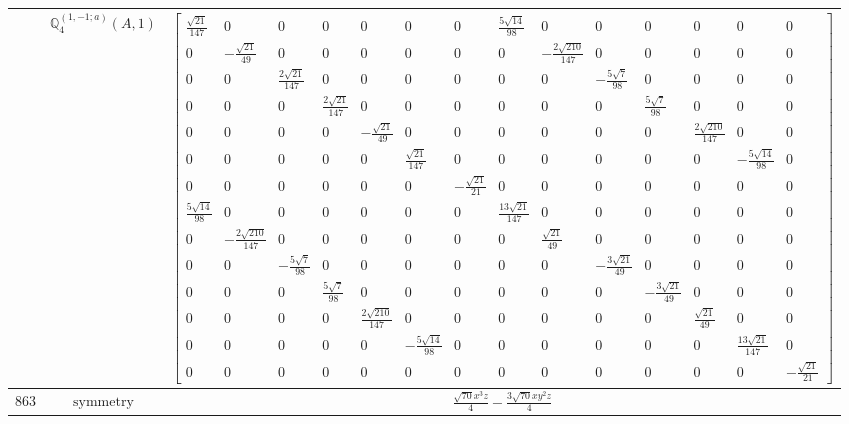 \documentclass[fleqn,8pt,landscape]{jsarticle}
\begin{document}
\begin{longtable}{ccc}
$  $ & $ \mathbb{Q}_{4}^{(1,-1;a)}(A,1) $ & $ \begin{bmatrix} \frac{\sqrt{21}}{147} & 0 & 0 & 0 & 0 & 0 & 0 & \frac{5 \sqrt{14}}{98} & 0 & 0 & 0 & 0 & 0 & 0 \\ 0 & - \frac{\sqrt{21}}{49} & 0 & 0 & 0 & 0 & 0 & 0 & - \frac{2 \sqrt{210}}{147} & 0 & 0 & 0 & 0 & 0 \\ 0 & 0 & \frac{2 \sqrt{21}}{147} & 0 & 0 & 0 & 0 & 0 & 0 & - \frac{5 \sqrt{7}}{98} & 0 & 0 & 0 & 0 \\ 0 & 0 & 0 & \frac{2 \sqrt{21}}{147} & 0 & 0 & 0 & 0 & 0 & 0 & \frac{5 \sqrt{7}}{98} & 0 & 0 & 0 \\ 0 & 0 & 0 & 0 & - \frac{\sqrt{21}}{49} & 0 & 0 & 0 & 0 & 0 & 0 & \frac{2 \sqrt{210}}{147} & 0 & 0 \\ 0 & 0 & 0 & 0 & 0 & \frac{\sqrt{21}}{147} & 0 & 0 & 0 & 0 & 0 & 0 & - \frac{5 \sqrt{14}}{98} & 0 \\ 0 & 0 & 0 & 0 & 0 & 0 & - \frac{\sqrt{21}}{21} & 0 & 0 & 0 & 0 & 0 & 0 & 0 \\ \frac{5 \sqrt{14}}{98} & 0 & 0 & 0 & 0 & 0 & 0 & \frac{13 \sqrt{21}}{147} & 0 & 0 & 0 & 0 & 0 & 0 \\ 0 & - \frac{2 \sqrt{210}}{147} & 0 & 0 & 0 & 0 & 0 & 0 & \frac{\sqrt{21}}{49} & 0 & 0 & 0 & 0 & 0 \\ 0 & 0 & - \frac{5 \sqrt{7}}{98} & 0 & 0 & 0 & 0 & 0 & 0 & - \frac{3 \sqrt{21}}{49} & 0 & 0 & 0 & 0 \\ 0 & 0 & 0 & \frac{5 \sqrt{7}}{98} & 0 & 0 & 0 & 0 & 0 & 0 & - \frac{3 \sqrt{21}}{49} & 0 & 0 & 0 \\ 0 & 0 & 0 & 0 & \frac{2 \sqrt{210}}{147} & 0 & 0 & 0 & 0 & 0 & 0 & \frac{\sqrt{21}}{49} & 0 & 0 \\ 0 & 0 & 0 & 0 & 0 & - \frac{5 \sqrt{14}}{98} & 0 & 0 & 0 & 0 & 0 & 0 & \frac{13 \sqrt{21}}{147} & 0 \\ 0 & 0 & 0 & 0 & 0 & 0 & 0 & 0 & 0 & 0 & 0 & 0 & 0 & - \frac{\sqrt{21}}{21} \end{bmatrix} $ \\ \hline
$ 863 $ & $ \text{symmetry} $ & $ \frac{\sqrt{70} x^{3} z}{4} - \frac{3 \sqrt{70} x y^{2} z}{4} $ \\

\end{longtable}
\end{document}
